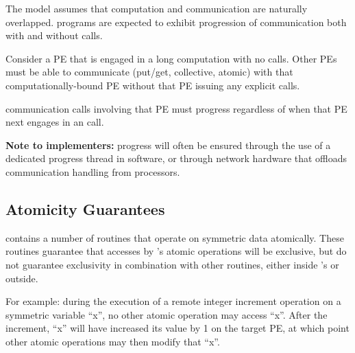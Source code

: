 The \openshmem model assumes that computation and communication are
naturally overlapped.  \openshmem programs are expected to exhibit
progression of communication both with and without \openshmem calls.

Consider a PE that is engaged in a long computation with no \openshmem calls.
Other PEs must be able to communicate (put/get,
collective, atomic) with that computationally-bound PE without that PE
issuing any explicit \openshmem calls.

\openshmem communication calls involving that PE must progress
regardless of when that PE next engages in an \openshmem call.

\textbf{Note to implementers:} progress will often be ensured through
the use of a dedicated progress thread in software, or through
network hardware that offloads communication handling from processors.

\subsection{Atomicity Guarantees}

\openshmem contains a number of routines that operate on symmetric data
atomically.  These routines guarantee that accesses by \openshmem's
atomic operations will be exclusive, but do not guarantee exclusivity
in combination with other routines, either inside \openshmem's or
outside.

For example: during the execution of a remote integer increment
operation on a symmetric variable ``x'', no other \openshmem atomic
operation may access ``x''.  After the increment, ``x'' will have
increased its value by 1 on the target PE, at which point other
atomic operations may then modify that ``x''.

